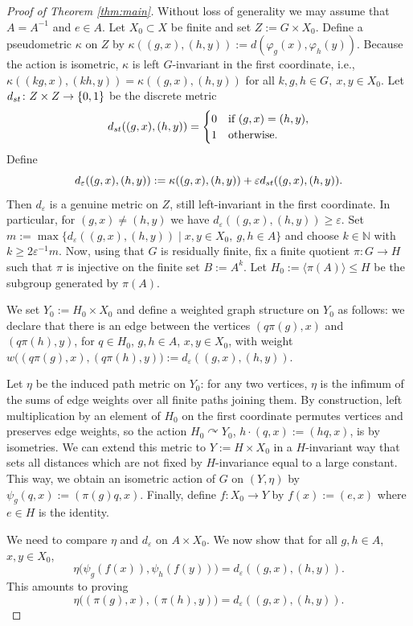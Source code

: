 \documentclass[10pt,a4paper]{amsart}
\begin{document}
\begin{proof}[Proof of Theorem \ref{thm:main}]
Without loss of generality we may assume that $A=A^{-1}$ and $e \in A$.
Let $X_0\subset X$ be finite and set $Z:=G \times X_0.$
Define a pseudometric $\kappa$ on $Z$ by
$\kappa((g,x),(h,y)) := d(\varphi_g(x),\varphi_h(y)).$
Because the action is isometric, $\kappa$ is left $G$-invariant in the first coordinate, i.e.,
$\kappa((kg,x),(kh,y)) = \kappa((g,x),(h,y))$ for all $k,g,h\in G,\ x,y\in X_0$.
Let $d_{\rm st}\colon Z\times Z\to\{0,1\}$ be the discrete metric
\[
d_{\rm st}((g,x),(h,y)) =
\begin{cases}
0 &\text{if } (g,x)=(h,y),\\
1 &\text{otherwise.}
\end{cases}
\]
Define
\[
d_{\varepsilon}((g,x),(h,y)):=\kappa((g,x),(h,y)) + \varepsilon d_{\rm st}((g,x),(h,y)).
\]
Then $d_\varepsilon$ is a genuine metric on $Z$, still left-invariant in the first coordinate. In particular, for $(g,x)\neq(h,y)$ we have $d_\varepsilon((g,x),(h,y))\ge\varepsilon$.
Set $m:= \max \{d_{\varepsilon}((g,x),(h,y)) \mid x,y \in X_0,\ g,h \in A\}$
and choose $k\in \mathbb N$ with $k \geq 2\varepsilon^{-1}m.$
Now, using that $G$ is residually finite, fix a finite quotient
$ \pi\colon G\to H$
such that $\pi$ is injective on the finite set $B:=A^{k}$. Let $H_0:=\langle \pi(A)\rangle\le H$ be the subgroup generated by $\pi(A)$.

We set $Y_0:=H_0\times X_0$ and define a weighted graph structure on $Y_0$ as follows: we declare that there is an edge between the vertices
$(q\pi(g),x)$ and $(q\pi(h),y)$, for $q\in H_0$, $g,h\in A$, $x,y\in X_0$, with weight
$w\bigl((q\pi(g),x),(q\pi(h),y)\bigr)
:= d_\varepsilon((g,x),(h,y)).$

Let $\eta$ be the induced path metric on $Y_0$: for any two vertices, $\eta$ is the infimum of the sums of edge weights over all finite paths joining them. By construction, left multiplication by an element of $H_0$ on the first coordinate permutes vertices and preserves edge weights, so the action
$H_0\curvearrowright Y_0$, $h\cdot(q,x):=(hq,x)$,
is by isometries. We can extend this metric to $Y:=H \times X_0$ in a $H$-invariant way that sets all distances which are not fixed by $H$-invariance equal to a large constant. This way, 
we obtain an isometric action of  $G$ on $(Y,\eta)$ by
$\psi_g(q,x):=(\pi(g)q,x).$ Finally, define $f\colon X_0\to Y$ by $f(x):=(e,x)$ where $e\in H$ is the identity.

We need to compare $\eta$ and $d_\varepsilon$ on $A\times X_0$. We now show that for all $g,h\in A$, $x,y\in X_0$,
\begin{equation}\label{eq:eta-deps}
\eta\bigl(\psi_g(f(x)),\psi_h(f(y))\bigr)
= d_\varepsilon((g,x),(h,y)).
\end{equation}
This amounts to proving
\[
\eta\bigl((\pi(g),x),(\pi(h),y)\bigr) = d_\varepsilon((g,x),(h,y)).
\]


\end{proof}
\end{document}
